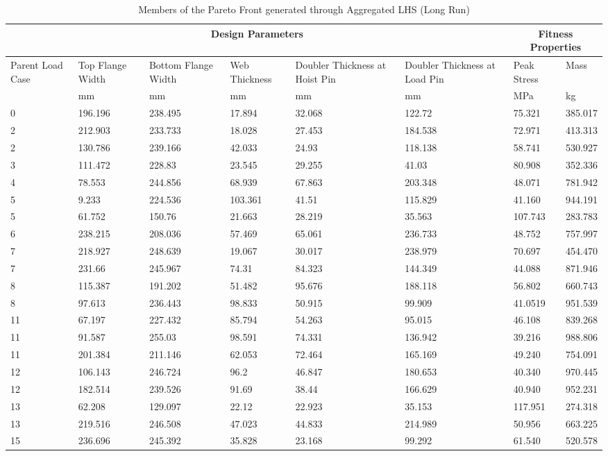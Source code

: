 \begin{table}[!htbp]
\small
\caption{Members of the Pareto Front generated through Aggregated LHS (Long Run)}
\label{tab:pfront_agg_long}
\begin{tabular}{|p{1.5cm}p{1.5cm}p{1.5cm}p{1.4cm}p{2cm}p{2cm}||p{1.5cm}p{1.5cm}|}
\hline
\multicolumn{6}{|c||}{Design Parameters}&\multicolumn{2}{|c|}{Fitness Properties}\\
\hline
Parent Load Case&Top Flange Width&Bottom Flange Width&Web Thickness&Doubler Thickness at Hoist Pin&Doubler Thickness at Load Pin&Peak Stress& Mass\\
\hline
&mm&mm&mm&mm&mm&MPa&kg\\
\hline
0&196.196&238.495&17.894&32.068&122.72&75.321&385.017\\
2&212.903&233.733&18.028&27.453&184.538&72.971&413.313\\
2&130.786&239.166&42.033&24.93&118.138&58.741&530.927\\
3&111.472&228.83&23.545&29.255&41.03&80.908&352.336\\
4&78.553&244.856&68.939&67.863&203.348&48.071&781.942\\
5&9.233&224.536&103.361&41.51&115.829&41.160&944.191\\
5&61.752&150.76&21.663&28.219&35.563&107.743&283.783\\
6&238.215&208.036&57.469&65.061&236.733&48.752&757.997\\
7&218.927&248.639&19.067&30.017&238.979&70.697&454.470\\
7&231.66&245.967&74.31&84.323&144.349&44.088&871.946\\
8&115.387&191.202&51.482&95.676&188.118&56.802&660.743\\
8&97.613&236.443&98.833&50.915&99.909&41.0519&951.539\\
11&67.197&227.432&85.794&54.263&95.015&46.108&839.268\\
11&91.587&255.03&98.591&74.331&136.942&39.216&988.806\\
11&201.384&211.146&62.053&72.464&165.169&49.240&754.091\\
12&106.143&246.724&96.2&46.847&180.653&40.340&970.445\\
12&182.514&239.526&91.69&38.44&166.629&40.940&952.231\\
13&62.208&129.097&22.12&22.923&35.153&117.951&274.318\\
13&219.516&246.508&47.023&44.833&214.989&50.956&663.225\\
15&236.696&245.392&35.828&23.168&99.292&61.540&520.578\\

\end{tabular}
\end{table}

